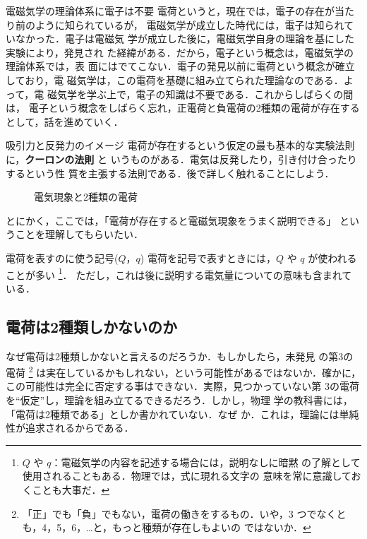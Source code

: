     \begin{mysmallsec}{電磁気学の理論体系に電子は不要}
    電荷というと，現在では，電子の存在が当たり前のように知られているが，
    電磁気学が成立した時代には，電子は知られていなかった．電子は電磁気
    学が成立した後に，電磁気学自身の理論を基にした実験により，発見され
    た経緯がある．だから，電子という概念は，電磁気学の理論体系では，表
    面にはでてこない．電子の発見以前に電荷という概念が確立しており，電
    磁気学は，この電荷を基礎に組み立てられた理論なのである．よって，電
    磁気学を学ぶ上で，電子の知識は不要である．これからしばらくの間は，
    電子という概念をしばらく忘れ，正電荷と負電荷の2種類の電荷が存在する
    として，話を進めていく．
    \end{mysmallsec}

    \begin{mysmallsec}{吸引力と反発力のイメージ}
    電荷が存在するという仮定の最も基本的な実験法則に，\textbf{クーロンの法則} と
    いうものがある．電気は反発したり，引き付け合ったりするという性
    質を主張する法則である．後で詳しく触れることにしよう．
        \begin{figure}[hbt]
            \begin{center}
                \caption{電気現象と2種類の電荷}
                \label{fig:EM_Denka_No_Katei}
            \end{center}
        \end{figure}

    とにかく，ここでは，「電荷が存在すると電磁気現象をうまく説明できる」
    ということを理解してもらいたい．
    \end{mysmallsec}

    \begin{mysmallsec}{電荷を表すのに使う記号($Q$，$q$)}
    電荷を記号で表すときには，$Q$ や $q$ が使われることが多い
        \footnote{
            $Q$ や $q$：電磁気学の内容を記述する場合には，説明なしに暗黙
            の了解として使用されることもある．物理では，式に現れる文字の
            意味を常に意識しておくことも大事だ．
        }．
    ただし，これは後に説明する電気量についての意味も含まれている．
    \end{mysmallsec}

    \subsection{電荷は2種類しかないのか}
    なぜ電荷は2種類しかないと言えるのだろうか．もしかしたら，未発見
    の第3の電荷
        \footnote{
            「正」でも「負」でもない，電荷の働きをするもの．いや，3
            つでなくとも，4，5，6，…と，もっと種類が存在しもよいの
            ではないか．
        }
    は実在しているかもしれない，という可能性があるではないか．確かに，
    この可能性は完全に否定する事はできない．実際，見つかっていない第
    3の電荷を“仮定”し，理論を組み立てるできるだろう．しかし，物理
    学の教科書には，「電荷は2種類である」としか書かれていない．なぜ
    か．これは，理論には単純性が追求されるからである．

